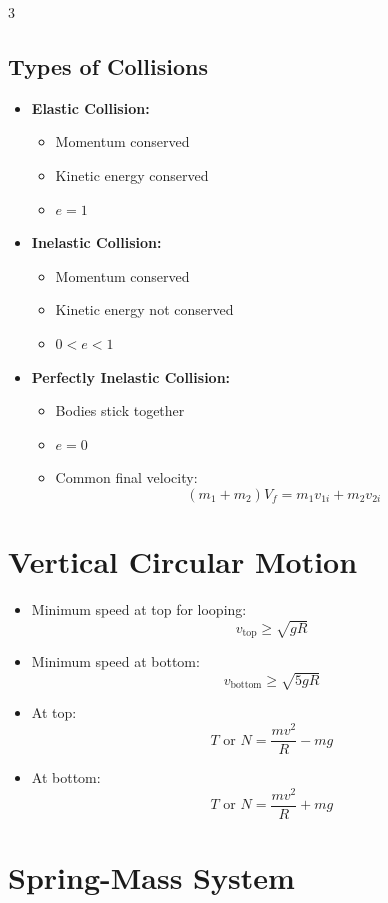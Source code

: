 \documentclass[10pt,a4paper]{article}
\newcommand{\important}[1]{\textbf{#1}}
\begin{document}
\begin{multicols}{3}
\subsection{Types of Collisions}

\begin{itemize}
    \item \important{Elastic Collision:}
    \begin{itemize}
        \item Momentum conserved
        \item Kinetic energy conserved
        \item $e=1$
    \end{itemize}
    \item \important{Inelastic Collision:}
    \begin{itemize}
        \item Momentum conserved
        \item Kinetic energy not conserved
        \item $0<e<1$
    \end{itemize}
    \item \important{Perfectly Inelastic Collision:}
    \begin{itemize}
        \item Bodies stick together
        \item $e=0$
        \item Common final velocity:
        \[
        (m_1+m_2)V_f = m_1v_{1i}+m_2v_{2i}
        \]
    \end{itemize}
\end{itemize}

\section{Vertical Circular Motion}

\begin{itemize}
    \item Minimum speed at top for looping:
    \[
    v_{\text{top}} \ge \sqrt{gR}
    \]
    \item Minimum speed at bottom:
    \[
    v_{\text{bottom}} \ge \sqrt{5gR}
    \]
    \item At top:
    \[
    T \text{ or } N = \frac{mv^2}{R} - mg
    \]
    \item At bottom:
    \[
    T \text{ or } N = \frac{mv^2}{R} + mg
    \]
\end{itemize}

\section{Spring-Mass System}


\end{multicols}
\end{document}
